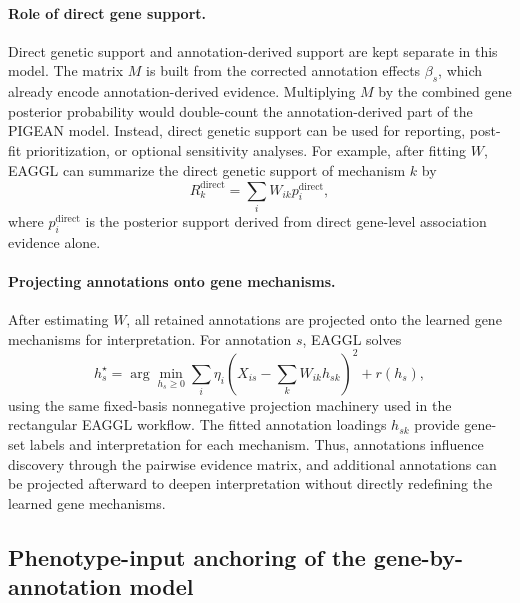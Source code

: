 \documentclass[11pt]{article}
\begin{document}
\paragraph{Role of direct gene support.}
Direct genetic support and annotation-derived support are kept separate in this model.
The matrix $M$ is built from the corrected annotation effects $\beta_s$, which already
encode annotation-derived evidence. Multiplying $M$ by the combined gene posterior
probability would double-count the annotation-derived part of the PIGEAN model.
Instead, direct genetic support can be used for reporting, post-fit prioritization, or
optional sensitivity analyses. For example, after fitting $W$, EAGGL can summarize the
direct genetic support of mechanism $k$ by
\begin{equation}
R_k^{\mathrm{direct}}
= \sum_i W_{ik} p_i^{\mathrm{direct}},
\label{eq:eaggl_gene_gene_direct_relevance}
\end{equation}
where $p_i^{\mathrm{direct}}$ is the posterior support derived from direct gene-level
association evidence alone.

\paragraph{Projecting annotations onto gene mechanisms.}
After estimating $W$, all retained annotations are projected onto the learned gene
mechanisms for interpretation. For annotation $s$, EAGGL solves
\begin{equation}
h_s^\star
=
\arg\min_{h_s\ge 0}
\sum_i \eta_i
\left(
X_{is} - \sum_k W_{ik}h_{sk}
\right)^2
+ r(h_s),
\label{eq:eaggl_gene_gene_annotation_projection}
\end{equation}
using the same fixed-basis nonnegative projection machinery used in the rectangular
EAGGL workflow. The fitted annotation loadings $h_{sk}$ provide gene-set labels and
interpretation for each mechanism. Thus, annotations influence discovery through the
pairwise evidence matrix, and additional annotations can be projected afterward to
deepen interpretation without directly redefining the learned gene mechanisms.


\subsection{Phenotype-input anchoring of the gene-by-annotation model}
\end{document}
